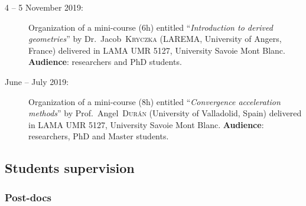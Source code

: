 \documentclass[final, a4paper, oneside, 12pt]{article}
\numberwithin{equation}{section}
\begin{document}
\begin{description}

  \item[4 -- 5 November 2019:] Organization of a mini-course (6h) entitled ``\textit{Introduction to derived geometries}'' by Dr.~Jacob~\textsc{Kryczka} (LAREMA, University of Angers, France) delivered in LAMA UMR 5127, University Savoie Mont Blanc. \textbf{Audience}: researchers and PhD students.

  \item[June -- July 2019:] Organization of a mini-course (8h) entitled ``\textit{Convergence acceleration methods}'' by Prof.~Angel~\textsc{Dur\'an} (University of Valladolid, Spain) delivered in LAMA UMR 5127, University Savoie Mont Blanc. \textbf{Audience}: researchers, PhD and Master students.

\end{description}

\subsection{Students supervision}

\subsubsection{Post-docs}
\end{document}
